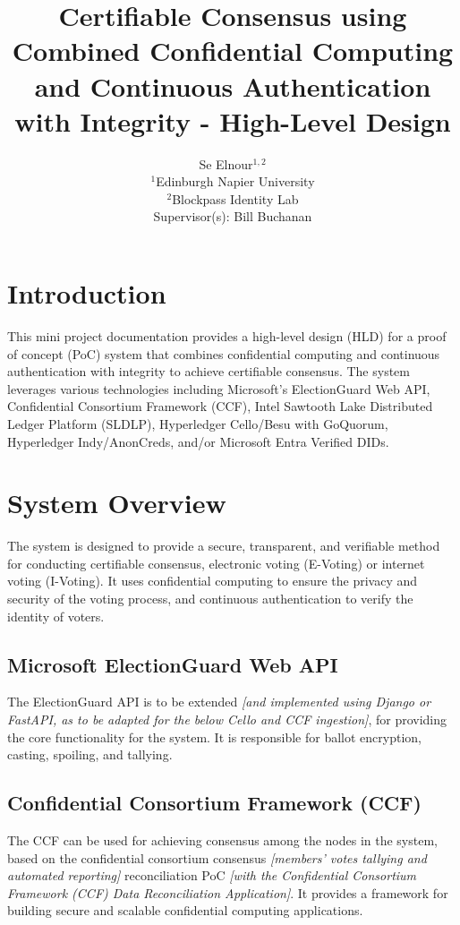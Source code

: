 \documentclass[11pt,a4paper]{article}
\begin{document}
\title{Certifiable Consensus using Combined Confidential Computing and Continuous Authentication with Integrity - High-Level Design}

\author{Se Elnour$^{1, 2}$  \\
  \small $^{1}$Edinburgh Napier University \\
  \small $^{2}$Blockpass Identity Lab \\
  Supervisor(s): Bill Buchanan%
}

\maketitle




\section{Introduction} This mini project documentation provides a high-level design (HLD) for a proof of concept (PoC) system that combines confidential computing and continuous authentication with integrity to achieve certifiable consensus. The system leverages various technologies including Microsoft’s ElectionGuard Web API, Confidential Consortium Framework (CCF), Intel Sawtooth Lake Distributed Ledger Platform (SLDLP), Hyperledger Cello/Besu with GoQuorum, Hyperledger Indy/AnonCreds, and/or Microsoft Entra Verified DIDs.

\section{System Overview} The system is designed to provide a secure, transparent, and verifiable method for conducting certifiable consensus, electronic voting (E-Voting) or internet voting (I-Voting). It uses confidential computing to ensure the privacy and security of the voting process, and continuous authentication to verify the identity of voters.
\subsection{Microsoft ElectionGuard Web API} The ElectionGuard API is to be extended \textit{[and implemented using Django or FastAPI, as to be adapted for the below Cello and CCF ingestion]}, for providing the core functionality for the system. It is responsible for ballot encryption, casting, spoiling, and tallying.
\subsection{Confidential Consortium Framework (CCF)} The CCF can be used for achieving consensus among the nodes in the system, based on the confidential consortium consensus \textit{[members’ votes tallying and automated reporting]} reconciliation PoC \textit{[with the Confidential Consortium Framework (CCF) Data Reconciliation Application]}. It provides a framework for building secure and scalable confidential computing applications.
\end{document}
